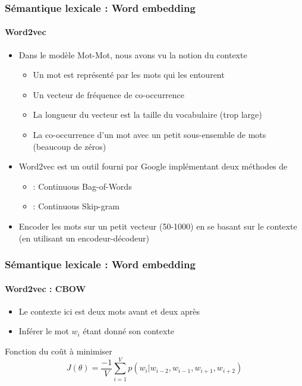 \documentclass[xcolor=table]{beamer}
\begin{document}
\begin{frame}
\frametitle{Sémantique lexicale : Word embedding}
\framesubtitle{Word2vec}

\begin{itemize}
	\item Dans le modèle Mot-Mot, nous avons vu la notion du contexte 
	\begin{itemize}
		\item Un mot est représenté par les mots qui les entourent
		\item Un vecteur de fréquence de co-occurrence
		\item La longueur du vecteur est la taille du vocabulaire (trop large)
		\item La co-occurrence d'un mot avec un petit sous-ensemble de mots (beaucoup de zéros)
	\end{itemize}
	\item Word2vec est un outil fourni par Google implémentant deux méthodes de  \cite{2013-mikolov-al}
	\begin{itemize}
		\item {} : Continuous Bag-of-Words
		\item {} : Continuous Skip-gram
	\end{itemize}
	\item Encoder les mots sur un petit vecteur (50-1000) en se basant sur le contexte (en utilisant un encodeur-décodeur)
\end{itemize}

\end{frame}

\begin{frame}
	\frametitle{Sémantique lexicale : Word embedding}
	\framesubtitle{Word2vec : CBOW}
\begin{minipage}{.58\textwidth}
	\begin{itemize}
		\item Le contexte ici est deux mots avant et deux après
		\item Inférer le mot $w_i$ étant donné son contexte
	\end{itemize}
	\begin{block}{Fonction du coût à minimiser}
		\[%
		J(\theta) = \frac{-1}{V} \sum_{i=1}^{V} p(w_i |w_{i-2}, w_{i-1}, w_{i+1}, w_{i+2})
		\]
	\end{block}
\end{minipage}
\begin{minipage}{.08\textwidth}
\end{minipage}	
\begin{minipage}{.4\textwidth}
\end{minipage}
	
\end{frame}
\end{document}
